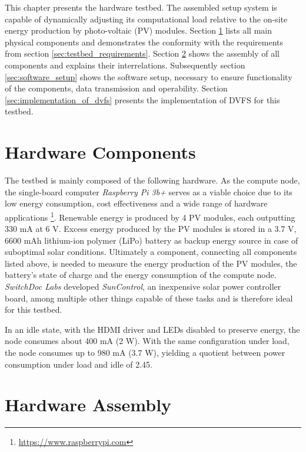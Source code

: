 This chapter presents the hardware testbed. The assembled setup system is
capable of dynamically adjusting its computational load relative to the on-site
energy production by photo-voltaic (PV) modules. Section
\ref{sec:hardware_components} lists all main physical components and
demonstrates the conformity with the requirements from section
\ref{sec:testbed_requirements}. Section \ref{sec:hardware_assembly} shows the
assembly of all components and explains their interrelations. Subsequently
section \ref{sec:software_setup} shows the software setup, necessary to ensure
functionality of the components, data transmission and operability. Section
\ref{sec:implementation_of_dvfs} presents the implementation of DVFS for this
testbed.

\section{Hardware Components}
\label{sec:hardware_components}

The testbed is mainly composed of the following hardware. As the compute node,
the single-board computer \emph{Raspberry Pi 3b+} serves as a viable choice due
to its low energy consumption, cost effectiveness and a wide range of hardware
applications \footnote{\url{https://www.raspberrypi.com}}. Renewable energy is
produced by 4 PV modules, each outputting 330 mA at 6 V. Excess energy produced
by the PV modules is stored in a 3.7 V, 6600 mAh lithium-ion polymer (LiPo)
battery as backup energy source in case of suboptimal solar conditions.
Ultimately a component, connecting all components listed above, is needed to
measure the energy production of the PV modules, the battery's state of charge
and the energy consumption of the compute node. \emph{SwitchDoc Labs} developed
\emph{SunControl}, an inexpensive solar power controller board, among multiple
other things capable of these tasks \cite{switchdoc_suncontrol} and is therefore
ideal for this testbed.

In an idle state, with the \textsc{HDMI} driver and \textsc{LED}s disabled to
preserve energy, the node consumes about 400 mA (2 W). With the same
configuration under load, the node consumes up to 980 mA (3.7 W), yielding a
quotient between power consumption under load and idle of 2.45.

\section{Hardware Assembly}
\label{sec:hardware_assembly}

